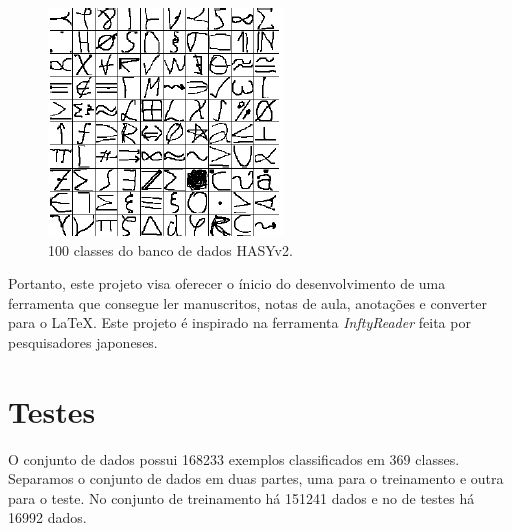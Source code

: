 \documentclass[
	12pt,				%
    oneside,			%
	a4paper,			%
	english,			%
	french,				%
	spanish,			%
	brazil,				%
	]{abntex2}
\begin{document}
        \begin{figure}[bht]
            \centering
            \includegraphics[width=.7\textwidth]{sampleshvsy2.png}
            \caption{100 classes do banco de dados HASYv2.}
            \label{fig:data100}
        \end{figure}

        Portanto, este projeto visa oferecer o ínicio do desenvolvimento de uma ferramenta que consegue ler manuscritos, notas de aula, anotações e converter para o \LaTeX . Este projeto é inspirado na ferramenta \emph{InftyReader} feita por pesquisadores japoneses.

    \section{Testes}%
        O conjunto de dados possui 168233 exemplos classificados em 369 classes. Separamos o conjunto de dados em duas partes, uma para o treinamento e outra para o teste. No conjunto de treinamento há 151241 dados e no de testes há 16992 dados.
\end{document}
